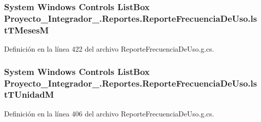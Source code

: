 \hypertarget{class_proyecto___integrador__3_1_1_reportes_1_1_reporte_frecuencia_de_uso_a54c8c7cb624219a3e3f23d61eded187b}{
\subsubsection[{lst\-T\-Meses\-M}]{\setlength{\rightskip}{0pt plus 5cm}System Windows Controls List\-Box Proyecto\-\_\-\-Integrador\-\_.\-Reportes.\-Reporte\-Frecuencia\-De\-Uso.\-lst\-T\-Meses\-M\hspace{0.3cm}{\ttfamily [package]}}}\label{class_proyecto___integrador__3_1_1_reportes_1_1_reporte_frecuencia_de_uso_a54c8c7cb624219a3e3f23d61eded187b}


Definición en la línea 422 del archivo Reporte\-Frecuencia\-De\-Uso.\-g.\-cs.

\hypertarget{class_proyecto___integrador__3_1_1_reportes_1_1_reporte_frecuencia_de_uso_ab12e78b5f637eefdfde63fba310cfaf5}{
\subsubsection[{lst\-T\-Unidad\-M}]{\setlength{\rightskip}{0pt plus 5cm}System Windows Controls List\-Box Proyecto\-\_\-\-Integrador\-\_.\-Reportes.\-Reporte\-Frecuencia\-De\-Uso.\-lst\-T\-Unidad\-M\hspace{0.3cm}{\ttfamily [package]}}}\label{class_proyecto___integrador__3_1_1_reportes_1_1_reporte_frecuencia_de_uso_ab12e78b5f637eefdfde63fba310cfaf5}


Definición en la línea 406 del archivo Reporte\-Frecuencia\-De\-Uso.\-g.\-cs.

